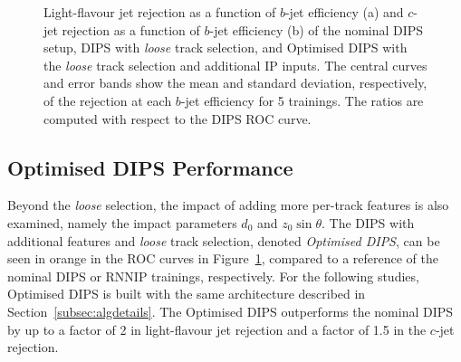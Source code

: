 \begin{figure}[htbp!]
    \centering
    \caption{Light-flavour jet rejection as a function of $b$-jet efficiency (a) and $c$-jet rejection as a function of $b$-jet efficiency (b) of the nominal DIPS setup, DIPS with \emph{loose} track selection, and Optimised DIPS with the \emph{loose} track selection and additional IP inputs. The central curves and error bands show the mean and standard deviation, respectively, of the rejection at each $b$-jet efficiency for 5 trainings. The ratios are computed with respect to the DIPS ROC curve.}
    \label{fig:ip3d_cuts}
\end{figure}


\subsection{Optimised DIPS Performance}
\label{subsec:optimiseddips}

Beyond the \textit{loose} selection, the impact of adding more per-track features is also examined, namely the impact parameters $d_0$ and $z_0 \sin\theta$. 
The DIPS with additional features and \textit{loose} track selection, denoted \textit{Optimised DIPS}, can be seen in orange in the ROC curves in Figure~\ref{fig:ip3d_cuts}, compared to a reference of the nominal DIPS or RNNIP trainings, respectively. 
For the following studies, Optimised DIPS is built with the same architecture described in Section~\ref{subsec:algdetails}.
The Optimised DIPS outperforms the nominal DIPS  by up to a factor of 2 in light-flavour jet rejection and a factor of 1.5 in the $c$-jet rejection.

